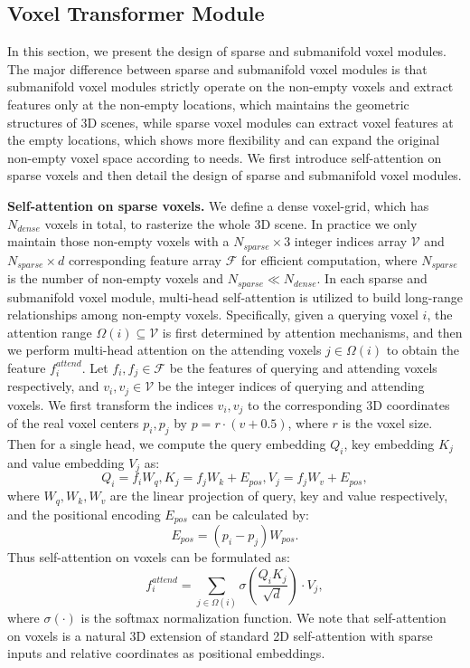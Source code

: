 \documentclass[10pt,twocolumn,letterpaper]{article}
\begin{document}
\subsection{Voxel Transformer Module}
In this section, we present the design of sparse and submanifold voxel modules. The major difference between sparse and submanifold voxel modules is that submanifold voxel modules strictly operate on the non-empty voxels and extract features only at the non-empty locations, which maintains the geometric structures of 3D scenes, while sparse voxel modules can extract voxel features at the empty locations, which shows more flexibility and can expand the original non-empty voxel space according to needs. We first introduce self-attention on sparse voxels and then detail the design of sparse and submanifold voxel modules.

\textbf{Self-attention on sparse voxels.} We define a dense voxel-grid, which has $N_{dense}$ voxels in total, to rasterize the whole 3D scene. In practice we only maintain those non-empty voxels with a $N_{sparse} \times 3$ integer indices array $\mathcal{V}$ and $N_{sparse} \times d$ corresponding feature array $\mathcal{F}$ for efficient computation, where $N_{sparse}$ is the number of non-empty voxels and $N_{sparse} \ll N_{dense}$. In each sparse and submanifold voxel module, multi-head self-attention is utilized to build long-range relationships among non-empty voxels. Specifically, given a querying voxel $i$, the attention range $\Omega(i) \subseteq \mathcal{V}$ is first determined by attention mechanisms, and then we perform multi-head attention on the attending voxels $j \in \Omega(i)$ to obtain the feature $f^{attend}_{i}$. Let $f_{i}, f_{j} \in \mathcal{F}$ be the features of querying and attending voxels respectively, and $v_{i}, v_{j} \in \mathcal{V}$ be the integer indices of querying and attending voxels. We first transform the indices $v_{i}, v_{j}$ to the corresponding 3D coordinates of the real voxel centers $p_{i}, p_{j}$ by $p = r \cdot (v+0.5)$, where $r$ is the voxel size. Then for a single head, we compute the query embedding $Q_{i}$, key embedding $K_{j}$ and value embedding $V_{j}$ as:  
\begin{equation} \label{3.1.1}
    Q_{i} = f_{i}W_{q}, K_{j} = f_{j}W_{k} + E_{pos}, V_{j} = f_{j}W_{v} + E_{pos},
\end{equation}
where $W_{q}, W_{k}, W_{v}$ are the linear projection of query, key and value respectively, and the positional encoding $E_{pos}$ can be calculated by: 
\begin{equation} \label{3.1.2}
    E_{pos} = (p_{i} - p_{j})W_{pos}.
\end{equation}
Thus self-attention on voxels can be formulated as:
\begin{equation} \label{3.1.3}
    f_{i}^{attend} = \sum_{j \in \Omega(i)} \sigma(\frac{Q_{i}K_{j}}{\sqrt{d}}) \cdot V_{j},
\end{equation}
where $\sigma(\cdot)$ is the softmax normalization function. We note that self-attention on voxels is a natural 3D extension of standard 2D self-attention with sparse inputs and relative coordinates as positional embeddings.
\end{document}
